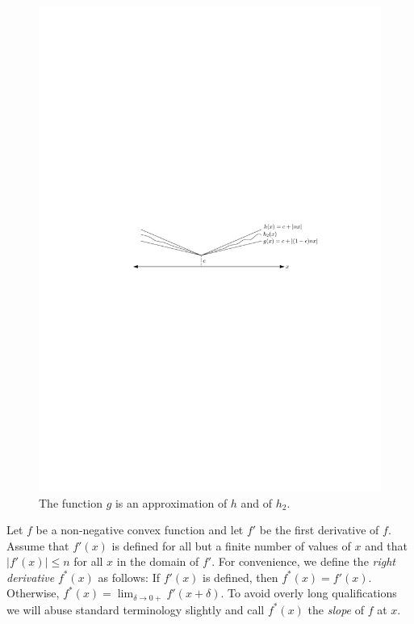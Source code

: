 \documentclass[charterfonts,lotsofwhite]{patmorin}
\begin{document}
\begin{figure}
\begin{center}\includegraphics{trivial}\end{center}
\caption{The function $g$ is an approximation of $h$ and
of $h_2$.}
\end{figure}

Let $f$ be a non-negative convex function and let $f'$ be the first
derivative of $f$.  Assume that $f'(x)$ is defined for all but a
finite number of values of $x$ and that $|f'(x)|\le n$ for all $x$ in
the domain of $f'$.  For convenience, we define the \emph{right
derivative} $f^*(x)$ as follows: If $f'(x)$ is defined, then
$f^*(x)=f'(x)$.  Otherwise, $f^*(x)=\lim_{\delta\rightarrow 0+}
f'(x+\delta)$.  To avoid overly long qualifications we will abuse
standard terminology slightly and call $f^*(x)$ the \emph{slope} of
$f$ at $x$.
\end{document}
